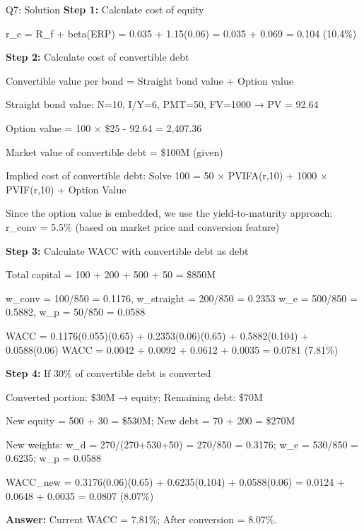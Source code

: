 \documentclass{beamer}
\renewcommand{\scriptsize}{\fontsize{6pt}{7pt}\selectfont}
\begin{document}
	\begin{frame}{Q7: Solution}
		\scriptsize
		\textbf{Step 1:} Calculate cost of equity
		
		r\_e = R\_f + beta(ERP) = 0.035 + 1.15(0.06) = 0.035 + 0.069 = 0.104 (10.4\%)
		
		\textbf{Step 2:} Calculate cost of convertible debt
		
		Convertible value per bond = Straight bond value + Option value
		
		Straight bond value: N=10, I/Y=6, PMT=50, FV=1000 → PV = 92.64
		
		Option value = 100 × \$25 - 92.64 = 2,407.36
		
		Market value of convertible debt = \$100M (given)
		
		Implied cost of convertible debt: Solve 100 = 50 × PVIFA(r,10) + 1000 × PVIF(r,10) + Option Value
		
		Since the option value is embedded, we use the yield-to-maturity approach:
		r\_conv = 5.5\% (based on market price and conversion feature)
		
		\textbf{Step 3:} Calculate WACC with convertible debt as debt
		
		Total capital = 100 + 200 + 500 + 50 = \$850M
		
		w\_conv = 100/850 = 0.1176, w\_straight = 200/850 = 0.2353
		w\_e = 500/850 = 0.5882, w\_p = 50/850 = 0.0588
		
		WACC = 0.1176(0.055)(0.65) + 0.2353(0.06)(0.65) + 0.5882(0.104) + 0.0588(0.06)
		WACC = 0.0042 + 0.0092 + 0.0612 + 0.0035 = 0.0781 (7.81\%)
		
		\textbf{Step 4:} If 30\% of convertible debt is converted
		
		Converted portion: \$30M → equity; Remaining debt: \$70M
		
		New equity = 500 + 30 = \$530M; New debt = 70 + 200 = \$270M
		
		New weights: w\_d = 270/(270+530+50) = 270/850 = 0.3176; w\_e = 530/850 = 0.6235; w\_p = 0.0588
		
		WACC\_new = 0.3176(0.06)(0.65) + 0.6235(0.104) + 0.0588(0.06)
		= 0.0124 + 0.0648 + 0.0035 = 0.0807 (8.07\%)
		
		\textbf{Answer:} Current WACC = 7.81\%; After conversion = 8.07\%.
	\end{frame}
	
\end{document}

